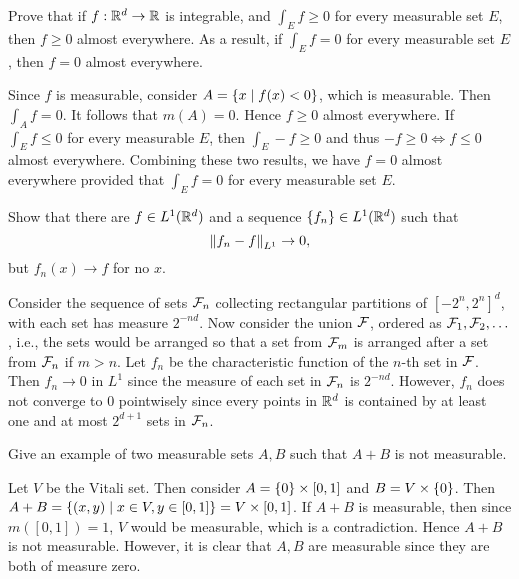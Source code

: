 \begin{exercise}
    Prove that if $f:\mathbb{R}^d\to\mathbb{R}$ is integrable, and $\int_E f \geq 0$ for 
    every measurable set $E$, then $f\geq 0$ almost everywhere. As a result, 
    if $\int_E f = 0$ for every measurable set $E$, then $f=0$ almost 
    everywhere. 
\end{exercise}
\begin{pf}
    Since $f$ is measurable, consider $A = \left\{ x \;\middle\vert\; f(x)< 0 \right\}$, which is 
    measurable. Then $\int_A f = 0$. It follows that $m(A) = 0$. Hence 
    $f\geq 0$ almost everywhere. If $\int_E f\leq 0$ for every measurable 
    $E$, then $\int_E -f \geq 0$ and thus $-f\geq 0\Leftrightarrow f\leq 0$ 
    almost everywhere. Combining these two results, we have $f=0$ almost 
    everywhere provided that $\int_E f = 0$ for every measurable set $E$.
\end{pf}

\begin{exercise}
    Show that there are $f\in L^1(\mathbb{R}^d)$ and a sequence $\left\{ {f_n} \right\}\in L^1(\mathbb{R}^d)$ 
    such that 
    \begin{equation*}
        \left\lVert {f_n-f} \right\rVert_{L^1}\to 0,
    \end{equation*}
    but $f_n(x)\to f$ for no $x$.
\end{exercise}
\begin{pf}
    Consider the sequence of sets $\mathcal{F}_n$ collecting rectangular partitions 
    of $[-2^n,2^n]^d$, with each set has measure $2^{-nd}$. Now consider 
    the union $\mathcal{F}$, ordered as $\mathcal{F}_1,\mathcal{F}_2,\ldots$, i.e., the sets would 
    be arranged so that a set from $\mathcal{F}_m$ is arranged after a set from $\mathcal{F}_n$ 
    if $m>n$. Let $f_n$ be the characteristic function of the $n$-th set in 
    $\mathcal{F}$. Then $f_n\to 0$ in $L^1$ since the measure of each set in $\mathcal{F}_n$ 
    is $2^{-nd}$. However, $f_n$ does not converge to $0$ pointwisely since 
    every points in $\mathbb{R}^d$ is contained by at least one and at most $2^{d+1}$ 
    sets in $\mathcal{F}_n$. 
\end{pf}

\begin{exercise}
    Give an example of two measurable sets $A,B$ such that $A+B$ is 
    not measurable.
\end{exercise}
\begin{pf}
    Let $V$ be the Vitali set. Then consider $A = \left\{ {0} \right\}\times[0,1]$ 
    and $B = V\times\left\{ {0} \right\}$. Then $A+B = \left\{ (x,y) \;\middle\vert\; x\in V, y\in[0,1] \right\} 
    = V\times[0,1]$. If $A+B$ is measurable, then since $m([0,1])=1$, 
    $V$ would be measurable, which is a contradiction. Hence $A+B$ is not 
    measurable. However, it is clear that $A,B$ are measurable since 
    they are both of measure zero. 
\end{pf}

